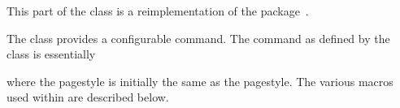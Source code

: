    This part of the class is a reimplementation of the 
package~\cite{TITLING}.

The class provides a configurable \cmd{\maketitle} command.
The \cmd{\maketitle} command as defined by the class 
is essentially
\begin{lcode}
\newcommand{\maketitle}{%
   \vspace*{\droptitle}
   \maketitlehooka
   {\pretitle \title \posttitle}
   \maketitlehookb
   {\preauthor \author \postauthor}
   \maketitlehookc
   {\predate \date \postdate}
   \maketitlehookd
   \thispagestyle{title}
}
\end{lcode}
where the  pagestyle is initially the same as the
 pagestyle.
The various macros used within \cmd{\maketitle} are described below.


